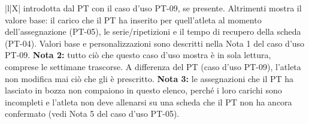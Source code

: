 \documentclass[../../../../SoftwareRequirementsSpecification.tex]{subfiles}
\begin{document}
\begin{xltabular}{\textwidth}{|l|X|}
{    introdotta dal PT con il caso d'uso PT-09, se presente. Altrimenti
    mostra il valore base: il carico che il PT ha inserito per
    quell'atleta al momento dell'assegnazione (PT-05), le
    serie/ripetizioni e il tempo di recupero della scheda (PT-04).
    Valori base e personalizzazioni sono descritti nella Nota 1 del
    caso d'uso PT-09.\newline
    \textbf{Nota 2:} tutto ciò che questo caso d'uso mostra è in sola
    lettura, comprese le settimane trascorse. A differenza del PT
    (caso d'uso PT-09), l'atleta non modifica mai ciò che gli è
    prescritto.\newline
    \textbf{Nota 3:} le assegnazioni che il PT ha lasciato in bozza
    non compaiono in questo elenco, perché i loro carichi sono
    incompleti e l'atleta non deve allenarsi su una scheda che il PT
    non ha ancora confermato (vedi Nota 5 del caso d'uso PT-05).
  } \\ \hline
\end{xltabular}
\end{document}

